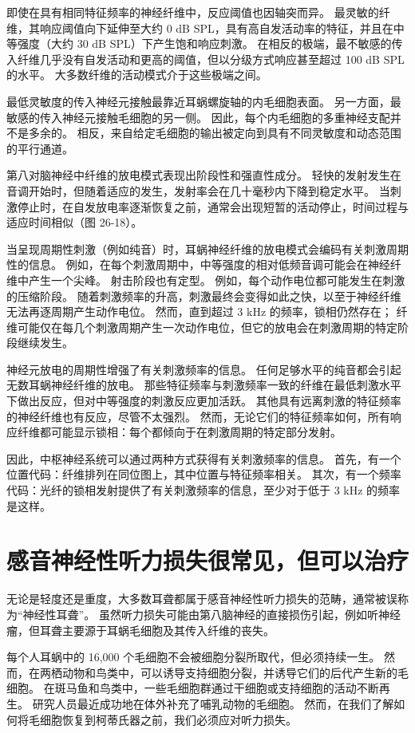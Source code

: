 即使在具有相同特征频率的神经纤维中，反应阈值也因轴突而异。 最灵敏的纤维，其响应阈值向下延伸至大约 0 dB SPL，具有高自发活动率的特征，并且在中等强度（大约 30 dB SPL）下产生饱和响应刺激。 在相反的极端，最不敏感的传入纤维几乎没有自发活动和更高的阈值，但以分级方式响应甚至超过 100 dB SPL 的水平。 大多数纤维的活动模式介于这些极端之间。

最低灵敏度的传入神经元接触最靠近耳蜗螺旋轴的内毛细胞表面。 另一方面，最敏感的传入神经元接触毛细胞的另一侧。 因此，每个内毛细胞的多重神经支配并不是多余的。 相反，来自给定毛细胞的输出被定向到具有不同灵敏度和动态范围的平行通道。

第八对脑神经中纤维的放电模式表现出阶段性和强直性成分。 轻快的发射发生在音调开始时，但随着适应的发生，发射率会在几十毫秒内下降到稳定水平。 当刺激停止时，在自发放电率逐渐恢复之前，通常会出现短暂的活动停止，时间过程与适应时间相似（图 26-18）。

当呈现周期性刺激（例如纯音）时，耳蜗神经纤维的放电模式会编码有关刺激周期性的信息。 例如，在每个刺激周期中，中等强度的相对低频音调可能会在神经纤维中产生一个尖峰。 射击阶段也有定型。 例如，每个动作电位都可能发生在刺激的压缩阶段。 随着刺激频率的升高，刺激最终会变得如此之快，以至于神经纤维无法再逐周期产生动作电位。 然而，直到超过 3 kHz 的频率，锁相仍然存在； 纤维可能仅在每几个刺激周期产生一次动作电位，但它的放电会在刺激周期的特定阶段继续发生。

神经元放电的周期性增强了有关刺激频率的信息。 任何足够水平的纯音都会引起无数耳蜗神经纤维的放电。 那些特征频率与刺激频率一致的纤维在最低刺激水平下做出反应，但对中等强度的刺激反应更加活跃。 其他具有远离刺激的特征频率的神经纤维也有反应，尽管不太强烈。 然而，无论它们的特征频率如何，所有响应纤维都可能显示锁相：每个都倾向于在刺激周期的特定部分发射。

因此，中枢神经系统可以通过两种方式获得有关刺激频率的信息。 首先，有一个位置代码：纤维排列在同位图上，其中位置与特征频率相关。 其次，有一个频率代码：光纤的锁相发射提供了有关刺激频率的信息，至少对于低于 3 kHz 的频率是这样。



\section{感音神经性听力损失很常见，但可以治疗}
无论是轻度还是重度，大多数耳聋都属于感音神经性听力损失的范畴，通常被误称为“神经性耳聋”。 虽然听力损失可能由第八脑神经的直接损伤引起，例如听神经瘤，但耳聋主要源于耳蜗毛细胞及其传入纤维的丧失。

每个人耳蜗中的 16,000 个毛细胞不会被细胞分裂所取代，但必须持续一生。 然而，在两栖动物和鸟类中，可以诱导支持细胞分裂，并诱导它们的后代产生新的毛细胞。 在斑马鱼和鸟类中，一些毛细胞群通过干细胞或支持细胞的活动不断再生。 研究人员最近成功地在体外补充了哺乳动物的毛细胞。 然而，在我们了解如何将毛细胞恢复到柯蒂氏器之前，我们必须应对听力损失。

